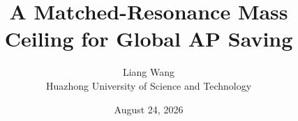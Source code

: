 \documentclass[11pt,a4paper]{article}\usepackage[margin=0.88in]{geometry}
\title{A Matched-Resonance Mass Ceiling for Global AP Saving}
\author{Liang Wang\\Huazhong University of Science and Technology}\date{August 24, 2026}
\begin{document}
\maketitle\begin{abstract}\end{abstract}


\end{document}
